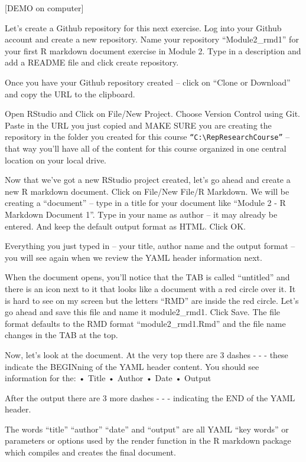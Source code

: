 \documentclass[]{book}
\theoremstyle{definition}
\theoremstyle{definition}
\theoremstyle{definition}
\theoremstyle{remark}
\begin{document}
{[}DEMO on computer{]}

Let's create a Github repository for this next exercise. Log into your
Github account and create a new repository. Name your repository
``Module2\_rmd1'' for your first R markdown document exercise in Module
2. Type in a description and add a README file and click create
repository.

Once you have your Github repository created -- click on ``Clone or
Download'' and copy the URL to the clipboard.

Open RStudio and Click on File/New Project. Choose Version Control using
Git. Paste in the URL you just copied and MAKE SURE you are creating the
repository in the folder you created for this course
\texttt{“C:\textbackslash{}RepResearchCourse”} -- that way you'll have
all of the content for this course organized in one central location on
your local drive.

Now that we've got a new RStudio project created, let's go ahead and
create a new R markdown document. Click on File/New File/R Markdown. We
will be creating a ``document'' -- type in a title for your document
like ``Module 2 - R Markdown Document 1''. Type in your name as author
-- it may already be entered. And keep the default output format as
HTML. Click OK.

Everything you just typed in -- your title, author name and the output
format -- you will see again when we review the YAML header information
next.

When the document opens, you'll notice that the TAB is called
``untitled'' and there is an icon next to it that looks like a document
with a red circle over it. It is hard to see on my screen but the
letters ``RMD'' are inside the red circle. Let's go ahead and save this
file and name it module2\_rmd1. Click Save. The file format defaults to
the RMD format ``module2\_rmd1.Rmd'' and the file name changes in the
TAB at the top.

Now, let's look at the document. At the very top there are 3 dashes - -
- these indicate the BEGINning of the YAML header content. You should
see information for the: • Title • Author • Date • Output

After the output there are 3 more dashes - - - indicating the END of the
YAML header.

The words ``title'' ``author'' ``date'' and ``output'' are all YAML
``key words'' or parameters or options used by the render function in
the R markdown package which compiles and creates the final document.
\end{document}
